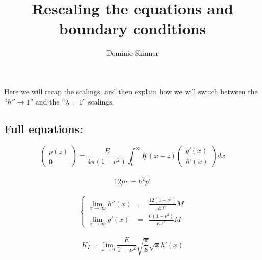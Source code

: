 \documentclass{article}
\begin{document}
\title{Rescaling the equations and boundary conditions}
\author{Dominic Skinner}
\maketitle
Here we will recap the scalings, and then explain how we will switch between
the ``$h''\to1$'' and the ``$\lambda = 1$'' scalings.
\subsection*{Full equations:}
%
\begin{equation}
 \left( \begin{array}{c} p(z) \\ 0 \end{array} \right) =
\frac{E}{4\pi (1-\nu^2)} \int_0^{\infty} 
\underline{\underline{K}}(x-z) 
\left( \begin{array}{c} g'(x) \\ h'(x) \end{array} \right) dx
\end{equation}
\\
\begin{equation}
12\mu c = h^2 p'
\end{equation}
\\
\begin{equation}
\left\{ \begin{array}{ccc}
\displaystyle \lim_{x\to\infty} h''(x) & = & \frac{12(1-\nu^2)}{E\ell^3} M \\
\displaystyle \lim_{x\to\infty} g'(x) & = & \frac{6(1-\nu^2)}{E\ell^3} M 
\end{array} \right.
\end{equation}
\\
\begin{equation}
K_I = \lim_{x\to 0} \frac{E}{1-\nu^2} \sqrt{\frac{\pi}{8}} \sqrt{x} h'(x)
\end{equation}
\\
\end{document}
